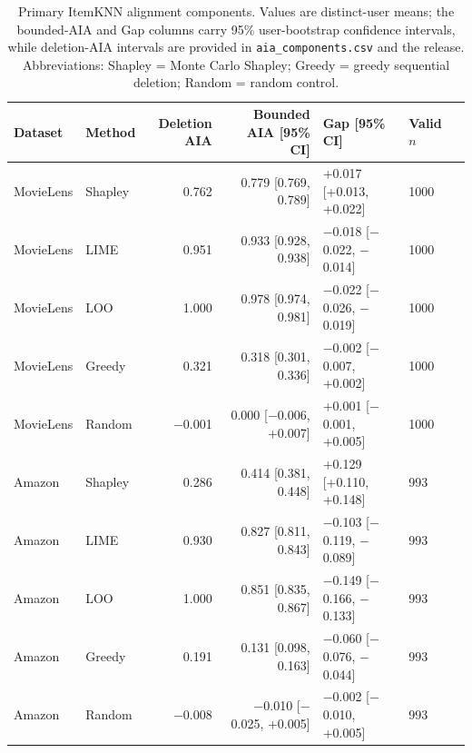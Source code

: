 \begin{table}[t]\centering\small
\setlength{\tabcolsep}{4pt}
\caption{Primary ItemKNN alignment components. Values are distinct-user means; the bounded-AIA and Gap columns carry 95\% user-bootstrap confidence intervals, while deletion-AIA intervals are provided in \texttt{aia\_components.csv} and the release. Abbreviations: Shapley = Monte Carlo Shapley; Greedy = greedy sequential deletion; Random = random control.}
\label{tab:aia-components}
\setlength{\tabcolsep}{3.5pt}
\begin{tabular}{@{}llrrllr@{}}
\toprule
Dataset & Method & Deletion AIA & Bounded AIA [95\% CI] & Gap [95\% CI] & Valid $n$ \\
\midrule
MovieLens & Shapley & 0.762 & 0.779 [0.769, 0.789] & +0.017 [+0.013, +0.022] & 1000 \\
MovieLens & LIME & 0.951 & 0.933 [0.928, 0.938] & $-$0.018 [$-$0.022, $-$0.014] & 1000 \\
MovieLens & LOO & 1.000 & 0.978 [0.974, 0.981] & $-$0.022 [$-$0.026, $-$0.019] & 1000 \\
MovieLens & Greedy & 0.321 & 0.318 [0.301, 0.336] & $-$0.002 [$-$0.007, +0.002] & 1000 \\
MovieLens & Random & $-$0.001 & 0.000 [$-$0.006, +0.007] & +0.001 [$-$0.001, +0.005] & 1000 \\
\midrule
Amazon & Shapley & 0.286 & 0.414 [0.381, 0.448] & +0.129 [+0.110, +0.148] & 993 \\
Amazon & LIME & 0.930 & 0.827 [0.811, 0.843] & $-$0.103 [$-$0.119, $-$0.089] & 993 \\
Amazon & LOO & 1.000 & 0.851 [0.835, 0.867] & $-$0.149 [$-$0.166, $-$0.133] & 993 \\
Amazon & Greedy & 0.191 & 0.131 [0.098, 0.163] & $-$0.060 [$-$0.076, $-$0.044] & 993 \\
Amazon & Random & $-$0.008 & $-$0.010 [$-$0.025, +0.005] & $-$0.002 [$-$0.010, +0.005] & 993 \\
\bottomrule
\end{tabular}
\end{table}
